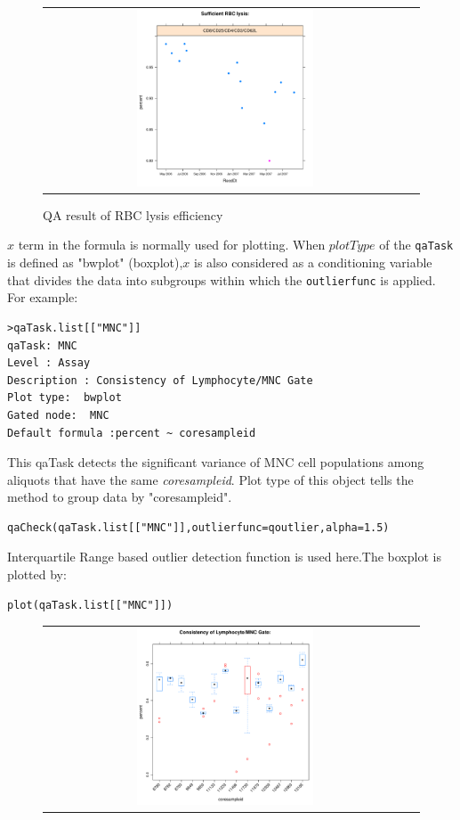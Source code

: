 \documentclass[10pt]{bmc_article}
\newenvironment{bmcformat}{\baselineskip20pt\sloppy\setboolean{publ}{false}}{\baselineskip20pt\sloppy}
\begin{document}
\begin{bmcformat}
\begin{figure}[h]
\begin{tabular}{cc}
\includegraphics[width=0.5\textwidth]{image/RBCLysis.pdf}
\end{tabular}
\caption{QA result of RBC lysis efficiency} 
\end{figure}
\clearpage
$x$ term in the formula is normally used for plotting. When $plotType$
of the \texttt{qaTask} is defined as "bwplot" (boxplot),$x$ is also considered as a conditioning variable that divides the data into subgroups within which the \texttt{outlierfunc} is applied. For
example:
\begin{verbatim}
>qaTask.list[["MNC"]]
qaTask: MNC 
Level : Assay 
Description : Consistency of Lymphocyte/MNC Gate 
Plot type:  bwplot
Gated node:  MNC
Default formula :percent ~ coresampleid
\end{verbatim}
This qaTask detects the significant variance of MNC cell populations among
aliquots that have the same \emph{coresampleid}. Plot type of this object tells the method to group data by "coresampleid".
\begin{verbatim}
qaCheck(qaTask.list[["MNC"]],outlierfunc=qoutlier,alpha=1.5)
\end{verbatim}
Interquartile Range based outlier detection function is used here.The boxplot is
plotted by:
\begin{verbatim}
plot(qaTask.list[["MNC"]])
\end{verbatim}
\begin{figure}[h]
\begin{tabular}{cc}
\includegraphics[width=0.5\textwidth]{image/MNC.pdf}&

\end{tabular}
\end{figure}
\end{bmcformat}
\end{document}
